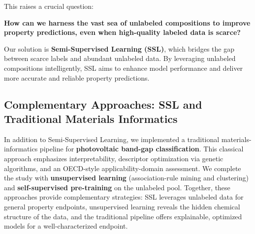 This raises a crucial question:

\begin{center}
\textbf{How can we harness the vast sea of unlabeled compositions to improve property
predictions, even when high-quality labeled data is scarce?}
\end{center}

Our solution is \textbf{Semi-Supervised Learning (SSL)}, which bridges the gap between scarce
labels and abundant unlabeled data. By leveraging unlabeled compositions intelligently, SSL aims
to enhance model performance and deliver more accurate and reliable property predictions.

\subsection{Complementary Approaches: SSL and Traditional Materials Informatics}

In addition to Semi-Supervised Learning, we implemented a traditional materials-informatics
pipeline for \textbf{photovoltaic band-gap classification}. This classical approach emphasizes
interpretability, descriptor optimization via genetic algorithms, and an OECD-style
applicability-domain assessment. We complete the study with \textbf{unsupervised learning}
(association-rule mining and clustering) and \textbf{self-supervised pre-training} on the
unlabeled pool. Together, these approaches provide complementary strategies: SSL leverages
unlabeled data for general property endpoints, unsupervised learning reveals the hidden
chemical structure of the data, and the traditional pipeline offers explainable, optimized
models for a well-characterized endpoint.
